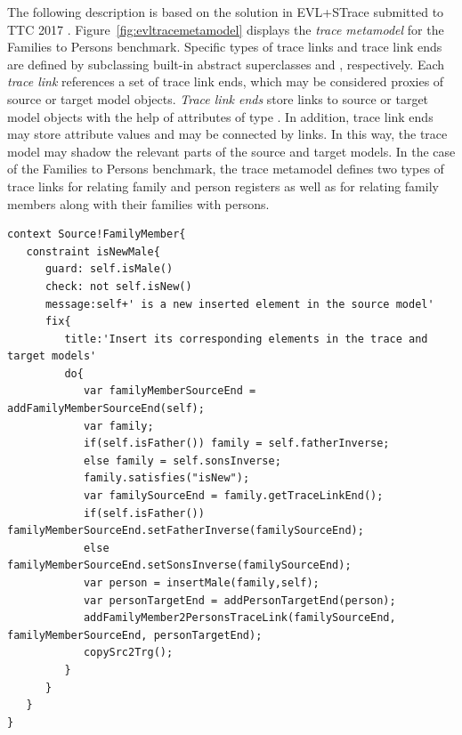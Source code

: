 The following description is based on the solution in EVL+STrace submitted to TTC 2017 \cite{Samimi-Dehkordi2017}.
Figure~\ref{fig:evltracemetamodel} displays the \emph{trace metamodel} for the Families to Persons benchmark. Specific types of trace links and trace link ends are defined by subclassing built-in abstract superclasses  and , respectively. Each \emph{trace link} references a set of trace link ends, which may be considered proxies of source or target model objects. \emph{Trace link ends} store links to source or target model objects with the help of attributes of type . In addition, trace link ends may store attribute values and may be connected by links. In this way, the trace model may shadow the relevant parts of the source and target models. In the case of the Families to Persons benchmark, the trace metamodel defines two types of trace links for relating family and person registers as well as for relating family members along with their families with persons.


 


\begin{lstlisting}[label={lst:evl}, float=*t, language=evl, caption={Example of an EVL constraint}]
context Source!FamilyMember{
   constraint isNewMale{
      guard: self.isMale()
      check: not self.isNew()
      message:self+' is a new inserted element in the source model'
      fix{
         title:'Insert its corresponding elements in the trace and target models'
         do{
            var familyMemberSourceEnd = addFamilyMemberSourceEnd(self);
            var family;
            if(self.isFather()) family = self.fatherInverse;
            else family = self.sonsInverse;
            family.satisfies("isNew");
            var familySourceEnd = family.getTraceLinkEnd(); 
            if(self.isFather()) familyMemberSourceEnd.setFatherInverse(familySourceEnd);			
            else familyMemberSourceEnd.setSonsInverse(familySourceEnd);			
            var person = insertMale(family,self);
            var personTargetEnd = addPersonTargetEnd(person);
            addFamilyMember2PersonsTraceLink(familySourceEnd, familyMemberSourceEnd, personTargetEnd);
            copySrc2Trg();
         }
      }
   }
}
\end{lstlisting}

